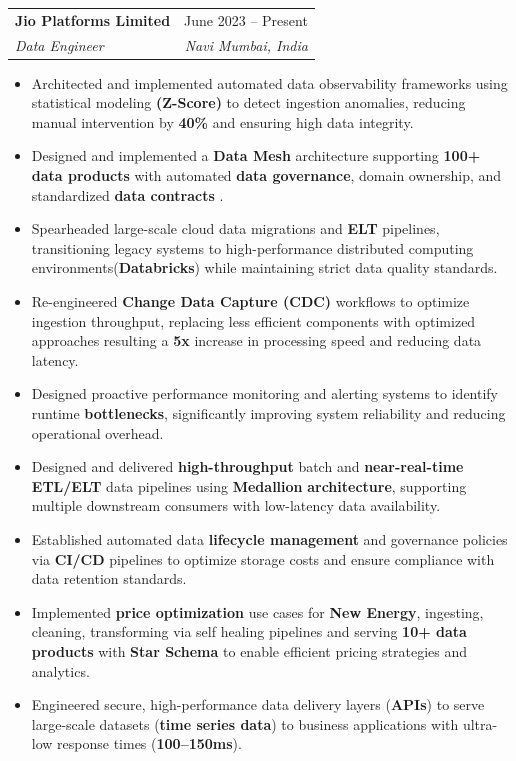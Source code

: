 \documentclass[letterpaper,11pt]{article}
\makeatletter
\newcommand{\resumeItem}[1]{
  \item\small{
    {#1 \vspace{-2pt}}
  }
}
\newcommand{\resumeSubheading}[4]{
  \vspace{-2pt}\item
    \begin{tabular*}{0.97\textwidth}[t]{l@{\extracolsep{\fill}}r}
      \textbf{#1} & #2 \\
  \textit{\small#3} & \textit{\small #4} \\
    \end{tabular*}\vspace{-7pt}
}
\newcommand{\resumeItemListStart}{\begin{itemize}}
\newcommand{\resumeItemListEnd}{\end{itemize}\vspace{-5pt}}
\makeatother
\begin{document}
      \resumeSubheading
      {Jio Platforms Limited}{June 2023 -- Present}
      {Data Engineer}{Navi Mumbai, India}
      \resumeItemListStart
        \resumeItem{Architected and implemented automated data observability frameworks using statistical modeling \textbf{(Z-Score)} to detect ingestion anomalies, reducing manual intervention by \textbf{40\%} and ensuring high data integrity.}
            \resumeItem{Designed and implemented a \textbf{Data Mesh} architecture supporting \textbf{100+ data products} with automated \textbf{data governance}, domain ownership, and standardized \textbf{data contracts }.}
\resumeItem{Spearheaded large-scale cloud data migrations and \textbf{ELT} pipelines, transitioning legacy systems to high-performance distributed computing environments(\textbf{Databricks}) while maintaining strict data quality standards.}
                \resumeItem{Re-engineered \textbf{Change Data Capture (CDC)} workflows to optimize ingestion throughput, replacing less efficient components with optimized approaches resulting a\textbf{ 5x }increase in processing speed and reducing data latency.}
        \resumeItem{Designed proactive performance monitoring and alerting systems to identify runtime \textbf{bottlenecks}, significantly improving system reliability and reducing operational overhead.}
                \resumeItem{Designed and delivered \textbf{high-throughput }batch\textbf{ }and\textbf{ near-real-time ETL/ELT }data pipelines using \textbf{Medallion} \textbf{architecture}, supporting multiple downstream consumers with low-latency data availability.}
        \resumeItem{Established automated data \textbf{lifecycle management} and governance policies via \textbf{CI/CD }pipelines to optimize storage costs and ensure compliance with data retention standards.}
        \resumeItem{ Implemented \textbf{price optimization} use cases for \textbf{New Energy}, ingesting, cleaning, transforming via self healing pipelines and serving \textbf{10+ data products} with \textbf{Star Schema} to enable efficient pricing strategies and analytics.}
        \resumeItem{Engineered secure, high-performance data delivery layers (\textbf{APIs}) to serve large-scale datasets (\textbf{time series data}) to business applications with ultra-low response times (\textbf{100–150ms}).}
      \resumeItemListEnd
\end{document}
